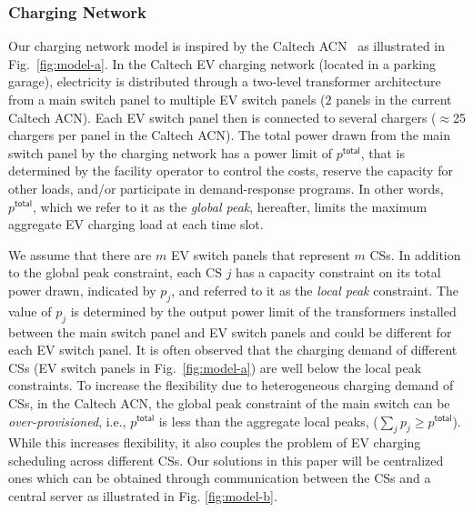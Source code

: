 \documentclass[journal]{IEEEtran}
\newcommand{\rev}[1]{{\color{black}#1}}%
\newcommand{\rev}[1]{#1}
\begin{document}
\subsubsection{Charging Network}
\label{sec:acn}
Our charging network model is inspired by the Caltech ACN~\cite{lee2016adaptive} as illustrated in Fig.~\ref{fig:model-a}. In \rev{the} Caltech EV charging network (located in a parking garage), electricity is distributed through a two-level transformer architecture from a main switch panel to multiple EV switch panels (\rev{$2$} panels in the current Caltech ACN). Each EV switch panel then is connected to several chargers ($\approx$25 chargers \rev{per panel} in the Caltech ACN). The total power drawn from the main switch panel \rev{by} the charging network has a power limit of  $p^\mathsf{total}$, that is determined by the facility operator to control the costs, reserve the capacity for other loads, and/or participate in demand-response programs.  
In other words, $p^\mathsf{total}$, which we refer to it as the \textit{global peak}, hereafter, limits the maximum aggregate EV charging load at each time slot. 

We assume that there are $m$ EV switch panels that represent $m$ CSs. In addition to the global peak constraint, each CS $j$ has \rev{a} capacity constraint on \rev{its} total power drawn, indicated by $p_j$, and referred to it as the \emph{local peak} constraint. The \rev{value of} $p_j$ is determined by the output power limit of the transformers installed between the main switch panel and EV switch panels and could be different for each EV switch panel.  
\rev{It is often observed that the charging demand of different CSs (EV switch panels in Fig.~\ref{fig:model-a}) are well below the local peak constraints.}
To increase the flexibility due to heterogeneous charging demand of CSs, in the Caltech ACN, the global peak constraint of the main switch can be \textit{over-provisioned}, i.e., $p^\mathsf{total}$ is less than the aggregate local peaks,  ($\sum_j p_j\geq p^\mathsf{total}$). \rev{While this increases flexibility, it also couples the problem of EV charging scheduling across different CSs.}
Our solutions in this paper will be centralized ones which can be obtained through communication between the CSs and a central server as illustrated in Fig. \ref{fig:model-b}.
\end{document}
